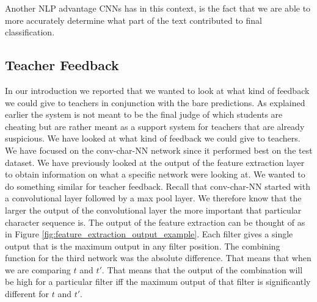 Another \gls{NLP} advantage \gls{CNN}s has in this context, is the fact that
we are able to more accurately determine what part of the text contributed to
final classification.

\subsection{Teacher Feedback}

In our introduction we reported that we wanted to look at what kind of feedback
we could give to teachers in conjunction with the bare predictions. As explained
earlier the system is not meant to be the final judge of which students are
cheating but are rather meant as a support system for teachers that are
already suspicious. We have looked at what kind of feedback we could give to
teachers. We have focused on the \gls{conv-char-NN} network since it performed
best on the test dataset. We have previously looked at the output of the
feature extraction layer to obtain information on what a specific network
were looking at. We wanted to do something similar for teacher feedback.
Recall that \gls{conv-char-NN} started with a convolutional layer followed
by a max pool layer. We therefore know that the larger the output of the
convolutional layer the more important that particular character sequence
is. The output of the feature extraction can be thought of as in Figure
\ref{fig:feature_extraction_output_example}. Each filter gives a single
output that is the maximum output in any filter position. The combining function
for the third network was the absolute difference. That means that when we
are comparing $t$ and $t'$. That means that the output of the combination
will be high for a particular filter iff the maximum output of that filter is
significantly different for $t$ and $t'$.

